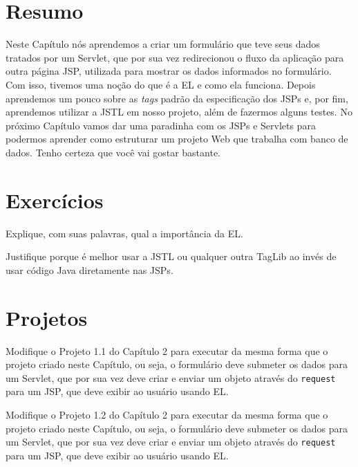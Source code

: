 \section{Resumo}

Neste Capítulo nós aprendemos a criar um formulário que teve seus dados tratados por um Servlet, que por sua vez redirecionou o fluxo da aplicação para outra página JSP, utilizada para mostrar os dados informados no formulário. Com isso, tivemos uma noção do que é a EL e como ela funciona. Depois aprendemos um pouco sobre as \textit{tags} padrão da especificação dos JSPs e, por fim, aprendemos utilizar a JSTL em nosso projeto, além de fazermos alguns testes. No próximo Capítulo vamos dar uma paradinha com os JSPs e Servlets para podermos aprender como estruturar um projeto Web que trabalha com banco de dados. Tenho certeza que você vai gostar bastante.


\section{Exercícios}

\begin{exercicioSemArquivo}{}{}{}
    Explique, com suas palavras, qual a importância da EL.
\end{exercicioSemArquivo}

\begin{exercicioSemArquivo}{}{}{}
    Justifique porque é melhor usar a JSTL ou qualquer outra TagLib ao invés de usar código Java diretamente nas JSPs.
\end{exercicioSemArquivo}

\section{Projetos}

\begin{projetoSemArquivo}{}{}{}
    Modifique o Projeto 1.1 do Capítulo 2 para executar da mesma forma que o projeto criado neste Capítulo, ou seja, o formulário deve submeter os dados para um Servlet, que por sua vez deve criar e enviar um objeto através do \texttt{request} para um JSP, que deve exibir ao usuário usando EL.
\end{projetoSemArquivo}

\begin{projetoSemArquivo}{}{}{}
    Modifique o Projeto 1.2 do Capítulo 2 para executar da mesma forma que o projeto criado neste Capítulo, ou seja, o formulário deve submeter os dados para um Servlet, que por sua vez deve criar e enviar um objeto através do \texttt{request} para um JSP, que deve exibir ao usuário usando EL.
\end{projetoSemArquivo}

